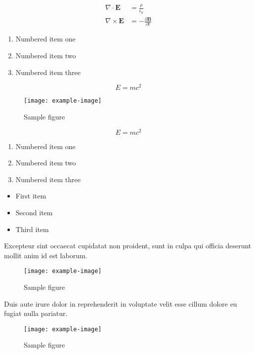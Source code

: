 \documentclass{article}
\begin{document}
\begin{align}
    \nabla \cdot \mathbf{E} &= \frac{\rho}{\epsilon_0} \\
    \nabla \times \mathbf{E} &= -\frac{\partial \mathbf{B}}{\partial t}
\end{align}

\begin{enumerate}
\item Numbered item one
\item Numbered item two
\item Numbered item three
\end{enumerate}

\begin{equation}
    E = mc^2
\end{equation}

\begin{figure}[h]
    \centering
    \texttt{[image: example-image]}
    \caption{Sample figure}
    \label{fig:sample}
\end{figure}

\begin{equation}
    E = mc^2
\end{equation}

\begin{enumerate}
\item Numbered item one
\item Numbered item two
\item Numbered item three
\end{enumerate}

\begin{itemize}
\item First item
\item Second item
\item Third item
\end{itemize}

Excepteur sint occaecat cupidatat non proident, sunt in culpa qui officia deserunt mollit anim id est laborum.

\begin{figure}[h]
    \centering
    \texttt{[image: example-image]}
    \caption{Sample figure}
    \label{fig:sample}
\end{figure}

Duis aute irure dolor in reprehenderit in voluptate velit esse cillum dolore eu fugiat nulla pariatur.

\begin{figure}[h]
    \centering
    \texttt{[image: example-image]}
    \caption{Sample figure}
    \label{fig:sample}
\end{figure}
\end{document}
